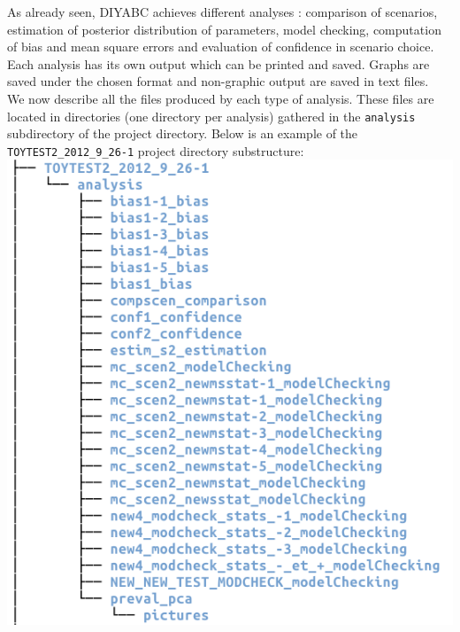 As already seen, DIYABC achieves different analyses : comparison of
scenarios, estimation of posterior distribution of parameters, model
checking, computation of bias and mean square errors and evaluation
of confidence in scenario choice. Each analysis has its own output
which can be printed and saved. Graphs are saved under the chosen
format and non-graphic output are saved in text files.\\


We now describe all the files produced by each type of analysis. These
files are located in directories (one directory per analysis) gathered
in the \texttt{analysis} subdirectory of the project directory. Below
is an example of the \texttt{TOYTEST2\_2012\_9\_26-1} project directory
substructure:\\


\includegraphics[scale=0.5]{gui_pictures/Capture-DIYABC-103}\\


